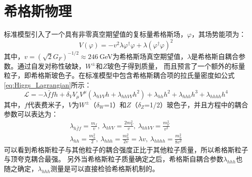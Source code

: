 \section{希格斯物理}
标准模型引入了一个具有非零真空期望值的复标量希格斯场，$\varphi$，其场势能项为：
\begin{equation}
 V(\varphi)=-v^2\lambda\varphi^{\dagger}\varphi+\lambda(\varphi^{\dagger}\varphi)^2
\end{equation}
其中，$v=(\sqrt{2}G_{F})^{-1/2}\approx246~$GeV为希格斯场真空期望值，$\lambda$是希格斯自耦合参数。通过自发对称性破缺，$W^{\pm}$和$Z$玻色子得到质量，
而且预言了一个额外的标量粒子，即希格斯玻色子。在标准模型中包含希格斯耦合项的拉氏量密度如公式\ref{eq:Higgs_Lagrangian}所示：
\begin{equation}
\label{eq:Higgs_Lagrangian}
\mathcal{L}=-\lambda\bar{f}fh+\delta_{V}V_{\mu}V^{\mu}(\lambda_{hVV}h+\lambda_{hhVV}h^2)+\lambda_{hh}h^2+\lambda_{hhh}h^3+\lambda_{hhhh}h^4
\end{equation}
其中，$f$代表费米子，$V$为$W^{\pm}$（$\delta_{W}$=1）和$Z$（$\delta_{Z}$=1/2）玻色子，并且方程中的耦合参数可以表达为：
\begin{equation}
 \begin{aligned}
 \lambda_{h\bar{f}f}=\frac{m_{f}}{v},~\lambda_{hVV}=\frac{2m_{V}^{2}}{v},~\lambda_{hhVV}=\frac{m_{V}^2}{v^2} \\
 \lambda_{hh}=\frac{m_{h}^2}{2},~\lambda_{hhh}=\frac{m_{h}^2}{2v}=\lambda v,~\lambda_{hhhh}=\frac{m_{h}^2}{8v^2}
 \end{aligned}
\end{equation}
可以看到希格斯粒子与其他粒子的耦合强度正比于其他粒子质量，所以希格斯粒子与顶夸克耦合最强。
另外当希格斯粒子质量确定之后，希格斯自耦合参数$\lambda_{hhh}$也随之确定，$\lambda_{hhh}$测量是可以直接检验希格斯机制的。

